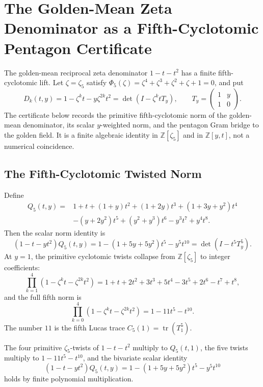 \chapter{The Golden-Mean Zeta Denominator as a Fifth-Cyclotomic Pentagon Certificate}
\label{ch:concrete-instances-window6-golden-mean-cyclotomic-pentagon}

The golden-mean reciprocal zeta denominator $1-t-t^2$ has a finite fifth-cyclotomic lift.  Let $\zeta=\zeta_5$ satisfy $\Phi_5(\zeta)=\zeta^4+\zeta^3+\zeta^2+\zeta+1=0$, and put
$$
D_k(t,y)=1-\zeta^k t-y\zeta^{2k}t^2=\det(I-\zeta^k tT_y),
\qquad
T_y=\begin{pmatrix}1&y\\1&0\end{pmatrix}.
$$
The certificate below records the primitive fifth-cyclotomic norm of the golden-mean denominator, its scalar $y$-weighted norm, and the pentagon Gram bridge to the golden field.  It is a finite algebraic identity in $\mathbb Z[\zeta_5]$ and in $\mathbb Z[y,t]$, not a numerical coincidence.

\section{The Fifth-Cyclotomic Twisted Norm}
\label{sec:window6-golden-mean-cyclotomic-norm}

Define
$$
\begin{aligned}
Q_5(t,y)={}&1+t+(1+y)t^2+(1+2y)t^3+(1+3y+y^2)t^4\\
&-(y+2y^2)t^5+(y^2+y^3)t^6-y^3t^7+y^4t^8.
\end{aligned}
$$
Then the scalar norm identity is
$$
(1-t-yt^2)Q_5(t,y)=1-(1+5y+5y^2)t^5-y^5t^{10}
=\det(I-t^5T_y^5).
$$
At $y=1$, the primitive cyclotomic twists collapse from $\mathbb Z[\zeta_5]$ to integer coefficients:
$$
\prod_{k=1}^{4}(1-\zeta^k t-\zeta^{2k}t^2)
=1+t+2t^2+3t^3+5t^4-3t^5+2t^6-t^7+t^8,
$$
and the full fifth norm is
$$
\prod_{k=0}^{4}(1-\zeta^k t-\zeta^{2k}t^2)=1-11t^5-t^{10}.
$$
The number $11$ is the fifth Lucas trace $C_5(1)=\operatorname{tr}(T_1^5)$.

\begin{theorem}
\label{thm:window6-golden-mean-cyclotomic-twisted-norm}
The four primitive $\zeta_5$-twists of $1-t-t^2$ multiply to $Q_5(t,1)$, the five twists multiply to $1-11t^5-t^{10}$, and the bivariate scalar identity
$$
(1-t-yt^2)Q_5(t,y)=1-(1+5y+5y^2)t^5-y^5t^{10}
$$
holds by finite polynomial multiplication.
\end{theorem}

